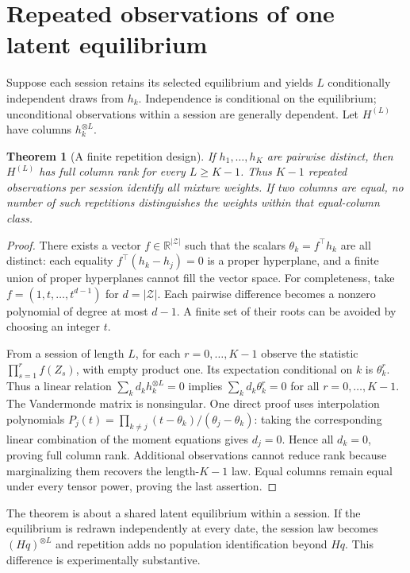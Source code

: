 \documentclass[11pt]{article}
\newtheorem{theorem}{Theorem}
\theoremstyle{remark}
\newcommand{\R}{\mathbb R}
\begin{document}
\section{Repeated observations of one latent equilibrium}
Suppose each session retains its selected equilibrium and yields $L$ conditionally independent draws from $h_k$. Independence is conditional on the equilibrium; unconditional observations within a session are generally dependent. Let $H^{(L)}$ have columns $h_k^{\otimes L}$.

\begin{theorem}[A finite repetition design]\label{repeat}
If $h_1,\ldots,h_K$ are pairwise distinct, then $H^{(L)}$ has full column rank for every $L\geq K-1$. Thus $K-1$ repeated observations per session identify all mixture weights. If two columns are equal, no number of such repetitions distinguishes the weights within that equal-column class.
\end{theorem}
\begin{proof}
There exists a vector $f\in\R^{|\mathcal Z|}$ such that the scalars $\theta_k=f^\top h_k$ are all distinct: each equality $f^\top(h_k-h_j)=0$ is a proper hyperplane, and a finite union of proper hyperplanes cannot fill the vector space. For completeness, take $f=(1,t,\ldots,t^{d-1})$ for $d=|\mathcal Z|$. Each pairwise difference becomes a nonzero polynomial of degree at most $d-1$. A finite set of their roots can be avoided by choosing an integer $t$.

From a session of length $L$, for each $r=0,\ldots,K-1$ observe the statistic $\prod_{s=1}^r f(Z_s)$, with empty product one. Its expectation conditional on $k$ is $\theta_k^r$. Thus a linear relation $\sum_k d_k h_k^{\otimes L}=0$ implies
$\sum_k d_k\theta_k^r=0$ for all $r=0,\ldots,K-1$. The Vandermonde matrix is nonsingular. One direct proof uses interpolation polynomials
$P_j(t)=\prod_{k\ne j}(t-\theta_k)/(\theta_j-\theta_k)$: taking the corresponding linear combination of the moment equations gives $d_j=0$. Hence all $d_k=0$, proving full column rank. Additional observations cannot reduce rank because marginalizing them recovers the length-$K-1$ law. Equal columns remain equal under every tensor power, proving the last assertion.
\end{proof}

The theorem is about a shared latent equilibrium within a session. If the equilibrium is redrawn independently at every date, the session law becomes $(Hq)^{\otimes L}$ and repetition adds no population identification beyond $Hq$. This difference is experimentally substantive.
\end{document}
